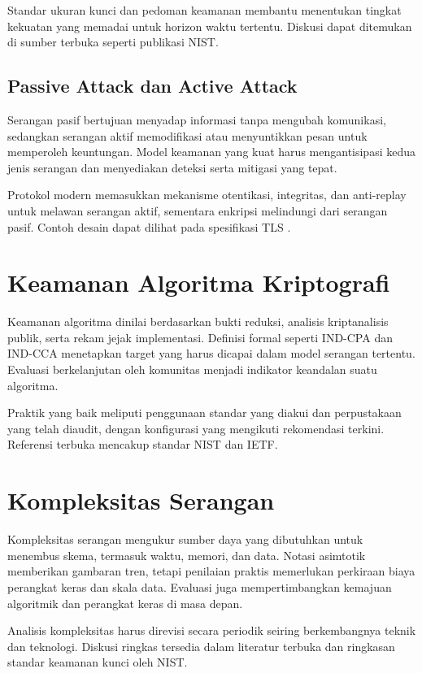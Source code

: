 \documentclass[../main.tex]{subfiles}
\begin{document}
Standar ukuran kunci dan pedoman keamanan membantu menentukan tingkat kekuatan yang memadai untuk horizon waktu tertentu. Diskusi dapat ditemukan di sumber terbuka seperti publikasi NIST.

\subsection{Passive Attack dan Active Attack}
Serangan pasif bertujuan menyadap informasi tanpa mengubah komunikasi, sedangkan serangan aktif memodifikasi atau menyuntikkan pesan untuk memperoleh keuntungan. Model keamanan yang kuat harus mengantisipasi kedua jenis serangan dan menyediakan deteksi serta mitigasi yang tepat.

Protokol modern memasukkan mekanisme otentikasi, integritas, dan anti-replay untuk melawan serangan aktif, sementara enkripsi melindungi dari serangan pasif. Contoh desain dapat dilihat pada spesifikasi TLS \parencite{rfc8446}.

\section{Keamanan Algoritma Kriptografi}
Keamanan algoritma dinilai berdasarkan bukti reduksi, analisis kriptanalisis publik, serta rekam jejak implementasi. Definisi formal seperti IND-CPA dan IND-CCA menetapkan target yang harus dicapai dalam model serangan tertentu. Evaluasi berkelanjutan oleh komunitas menjadi indikator keandalan suatu algoritma.

Praktik yang baik meliputi penggunaan standar yang diakui dan perpustakaan yang telah diaudit, dengan konfigurasi yang mengikuti rekomendasi terkini. Referensi terbuka mencakup standar NIST dan IETF.

\section{Kompleksitas Serangan}
Kompleksitas serangan mengukur sumber daya yang dibutuhkan untuk menembus skema, termasuk waktu, memori, dan data. Notasi asimtotik memberikan gambaran tren, tetapi penilaian praktis memerlukan perkiraan biaya perangkat keras dan skala data. Evaluasi juga mempertimbangkan kemajuan algoritmik dan perangkat keras di masa depan.

Analisis kompleksitas harus direvisi secara periodik seiring berkembangnya teknik dan teknologi. Diskusi ringkas tersedia dalam literatur terbuka dan ringkasan standar keamanan kunci oleh NIST.
\end{document}
